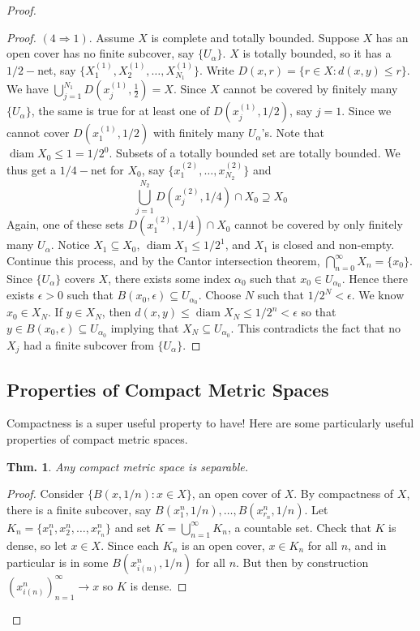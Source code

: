 \documentclass[12pt, a4paper]{book}
\DeclareMathOperator{\diam}{diam}
\newtheorem{theorem}{Thm.}[section]
\theoremstyle{nonumberplain}
\newtheorem{proof}{Proof}
\begin{document}
\begin{proof}
\begin{proof}
    $(4\Rightarrow 1)$. Assume $X$ is complete and totally bounded. Suppose $X$ has an open cover has no finite subcover,
    say $\{U_\alpha\}$. $X$ is totally bounded, so it has a $1/2-$net, say $\{X_1^{(1)},X_2^{(1)},\ldots,X_{N_1}^{(1)}\}$.
    Write $D(x,r)=\{r\in X:d(x,y)\leq r\}$. We have $\bigcup_{j=1}^{N_1} D\left(x_j^{(1)},\frac{1}{2}\right)=X$. Since
    $X$ cannot be covered by finitely many $\{U_{\alpha}\}$, the same is true for at least one of $D(x_j^{(1)},1/2)$,
    say $j=1$. Since we cannot cover $D(x_1^{(1)},1/2)$ with finitely many $U_\alpha$'s. Note that $\diam X_0\leq 1=1/2^0$.
    Subsets of a totally bounded set are totally bounded. We thus get a $1/4-$net for $X_0$, say $\{x_1^{(2)},\ldots,x_{N_2}^{(2)}\}$
    and
    \[\bigcup_{j=1}^{N_2} D(x_j^{(2)},1/4)\cap X_0\supseteq X_0\]
    Again, one of these sets $D(x_1^{(2)},1/4)\cap X_0$ cannot be covered by only finitely many $U_{\alpha}$. Notice $X_1\subseteq X_0$,
    $\diam X_1\leq 1/2^1$, and $X_1$ is closed and non-empty. Continue this process, and by the Cantor intersection theorem,
    $\bigcap_{n=0}^\infty X_n=\{x_0\}$. Since $\{U_\alpha\}$ covers $X$, there exists some index $\alpha_0$ such that
    $x_0\in U_{\alpha_0}$. Hence there exists $\epsilon>0$ such that $B(x_0,\epsilon)\subseteq U_{\alpha_0}$. Choose $N$
    such that $1/2^N<\epsilon$. We know $x_0\in X_N$. If $y\in X_N$, then $d(x,y)\leq\diam X_N\leq1/2^n<\epsilon$ so that
    $y\in B(x_0,\epsilon)\subseteq U_{\alpha_0}$ implying that $X_N\subseteq U_{\alpha_0}$. This contradicts the fact that no $X_j$
    had a finite subcover from $\{U_\alpha\}$.
\end{proof}
\subsection{Properties of Compact Metric Spaces}
Compactness is a super useful property to have!
Here are some particularly useful properties of compact metric spaces.
\begin{theorem}
    Any compact metric space is separable.
\end{theorem}
\begin{proof}
    Consider $\{B(x,1/n):x\in X\}$, an open cover of $X$.
    By compactness of $X$, there is a finite subcover, say $B(x_1^n,1/n),\ldots,B(x_{r_n}^n,1/n)$.
    Let $K_n=\{x_1^n,x_2^n,\ldots,x_{r_n}^n\}$ and set $K=\bigcup\limits_{n=1}^\infty K_n$, a countable set.
    Check that $K$ is dense, so let $x\in X$.
    Since each $K_n$ is an open cover, $x\in K_n$ for all $n$, and in particular is in some $B(x_{i(n)}^n,1/n)$ for all $n$.
    But then by construction $(x_{i(n)}^n)_{n=1}^\infty\to x$ so $K$ is dense.
\end{proof}


\end{proof}
\end{document}
